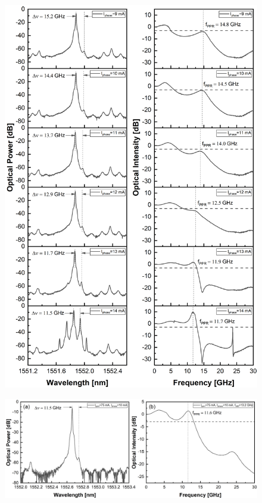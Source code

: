 \begin{figure}[!htb]
    \centering
    \includegraphics[width=.8\linewidth]{figures/spectra_and_bandwidth_6559.png}
    \caption{}
    \label{fig:spectra_and_bandwidth_6559}
\end{figure}

\begin{figure}[!htb]
    \centering
    \includegraphics[width=\linewidth]{figures/spectrum_and_bandwidth_6557.png}
    \caption{}
    \label{fig:spectra_and_bandwidth_6557}
\end{figure}

